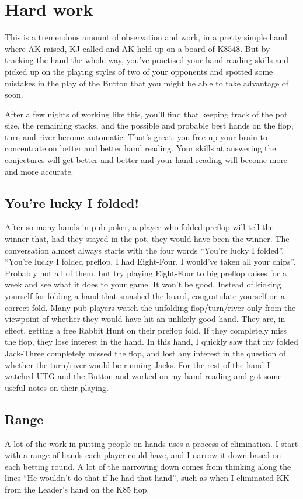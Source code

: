 \section{Hard work}

This is a tremendous amount of observation and work, in a pretty simple
hand where AK raised, KJ called and AK held up on a board of K8548. But
by tracking the hand the whole way, you've practised your hand reading skills
and picked up on the playing styles of two of your opponents and spotted
some mistakes in the play of the Button that you might be able to
take advantage of soon.

After a few nights of working like this, you'll find that keeping track
of the pot size, the remaining stacks, and the possible and probable
best hands on the flop, turn and river become automatic. That's great: you
free up your brain to concentrate on better and better hand reading. Your
skills at answering the conjectures will get better and better and your
hand reading will become more and more accurate.

\subsection*{You're lucky I folded!}

After so many hands in pub poker, a player who folded preflop will
tell the winner that, had they stayed in the pot, they would have been
the winner. The conversation almost always starts with the four words
``You're lucky I folded''. ``You're lucky I folded preflop, I had
Eight-Four, I would've taken all your chips''. Probably not all of
them, but try playing Eight-Four to big preflop raises for a week and
see what it does to your game. It won't be good. Instead of kicking
yourself for folding a hand that smashed the board, congratulate yourself
on a correct fold. Many pub players watch the unfolding
flop/turn/river only from the viewpoint of whether they would have hit
an unlikely good hand. They are, in effect, getting a free Rabbit Hunt
on their preflop fold. If they completely miss the flop, they lose
interest in the hand. In this hand, I quickly saw that my folded
Jack-Three completely missed the flop, and lost any interest in
the question of whether the turn/river would be running Jacks. For the
rest of the hand I watched UTG and the Button and worked on my hand
reading and got some useful notes on their playing.

\subsection*{Range}
A lot of the work in putting people on hands uses a process
of elimination. I start with a range of hands each player could have,
and I narrow it down based on each betting round. A lot of the narrowing
down comes from thinking along the lines ``He wouldn't do that if he
had that hand'', such as when I eliminated KK from the Leader's hand
on the K85 flop.

